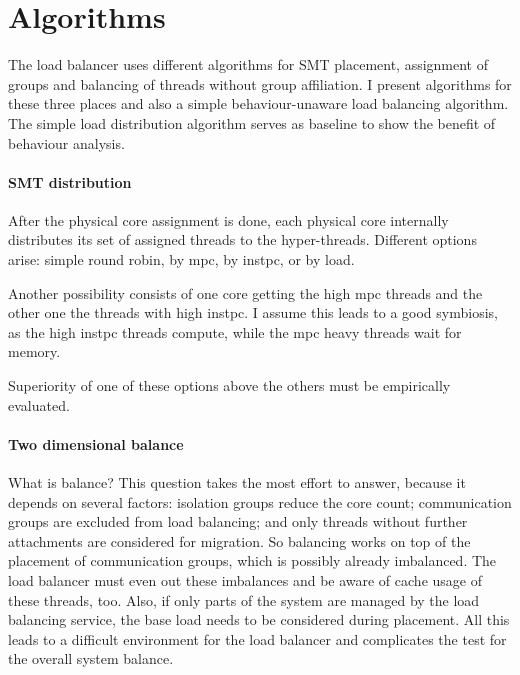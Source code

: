 \section{Algorithms}
\label{impl:algos}


The load balancer uses different algorithms for SMT placement, assignment of
groups and balancing of threads without group affiliation.
I present algorithms for these three places and also a simple behaviour-unaware
load balancing algorithm.
The simple load distribution algorithm serves as baseline to show the benefit of
behaviour analysis.

\paragraph{SMT distribution}
After the physical core assignment is done, each physical core internally
distributes its set of assigned threads to the hyper-threads.
Different options arise: simple round robin, by \gls{mpc}, by \gls{instpc}, or
by load.

Another possibility consists of one core getting the high \gls{mpc}
threads and the other one the threads with high \gls{instpc}.
I assume this leads to a good symbiosis, as the high \gls{instpc} threads compute,
while the \gls{mpc} heavy threads wait for memory.

Superiority of one of these options above the others must be empirically evaluated.


\paragraph{Two dimensional balance}
What is balance? This question takes the most effort to answer, because it
depends on several factors: isolation groups reduce the core count;
communication groups are excluded from load balancing;
and only threads without further attachments are considered for migration.
So balancing works on top of the placement of communication groups, which is
possibly already imbalanced.
The load balancer must even out these imbalances and be aware of cache usage of
these threads, too.
Also, if only parts of the system are managed by the load balancing service,
the base load needs to be considered during placement.
All this leads to a difficult environment for the load balancer and complicates
the test for the overall system balance.

